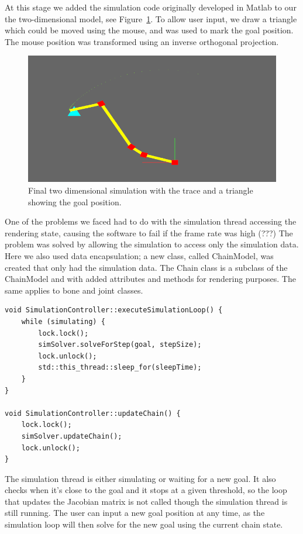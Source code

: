 \documentclass[paper=a4, fontsize=11pt]{scrartcl} %
\numberwithin{equation}{section} %
\numberwithin{figure}{section} %
\numberwithin{table}{section} %
\begin{document}
At this stage we added the simulation code originally developed in Matlab to our the two-dimensional model, see Figure~\ref{fig:2Dpicture}. To allow user input, we draw a triangle which could be moved using the mouse, and was used to mark the goal position. The mouse position was transformed using an inverse orthogonal projection. \\

\begin{figure}[h]
\centering
\includegraphics[scale=0.4]{chain2Dv2}
\caption{Final two dimensional simulation with the trace and a triangle showing the goal position.}
\label{fig:2Dpicture}
\end{figure}

One of the problems we faced had to do with the simulation thread accessing the rendering state, causing the software to fail if the frame rate was high (???) The problem was solved by allowing the simulation to access only the simulation data. Here we also used data encapsulation; a new class, called ChainModel, was created that only had the simulation data. The Chain class is a subclass of the ChainModel and with added attributes and methods for rendering purposes. The same applies to bone and joint classes. \\

\begin{lstlisting}[float,caption=Simulation controller thread synchronisation., label={lst:synchronisation}]		
void SimulationController::executeSimulationLoop() {
	while (simulating) {
		lock.lock();
		simSolver.solveForStep(goal, stepSize);
		lock.unlock();
		std::this_thread::sleep_for(sleepTime);
	}
}

void SimulationController::updateChain() {
	lock.lock();
	simSolver.updateChain();
	lock.unlock();
}
\end{lstlisting}

The simulation thread is either simulating or waiting for a new goal. It also checks when it's close to the goal and it stops at a given threshold, so the loop that updates the Jacobian matrix is not called though the simulation thread is still running. The user can input a new goal position at any time, as the simulation loop will then solve for the new goal using the current chain state.\\
\end{document}
